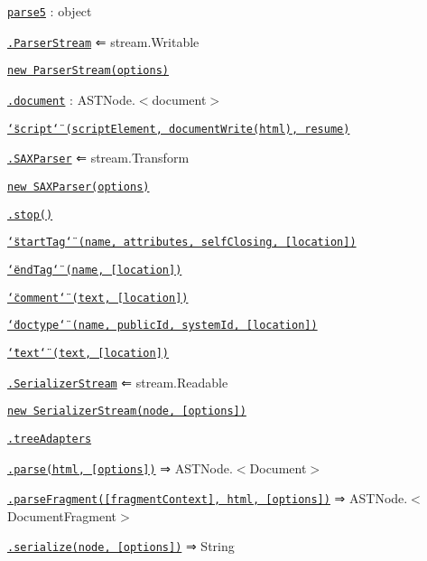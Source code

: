 \begin{DoxyItemize}
\item \href{#parse5}{\tt parse5} \+: {\ttfamily object}
\begin{DoxyItemize}
\item \href{#parse5+ParserStream}{\tt .Parser\+Stream} ⇐ {\ttfamily stream.\+Writable}
\begin{DoxyItemize}
\item \href{#new_parse5+ParserStream_new}{\tt new Parser\+Stream(options)}
\item \href{#parse5+ParserStream+document}{\tt .document} \+: {\ttfamily A\+S\+T\+Node.$<$document$>$}
\item \href{#parse5+ParserStream+event_script}{\tt \char`\"{}script\char`\"{} (script\+Element, document\+Write(html), resume)}
\end{DoxyItemize}
\item \href{#parse5+SAXParser}{\tt .S\+A\+X\+Parser} ⇐ {\ttfamily stream.\+Transform}
\begin{DoxyItemize}
\item \href{#new_parse5+SAXParser_new}{\tt new S\+A\+X\+Parser(options)}
\item \href{#parse5+SAXParser+stop}{\tt .stop()}
\item \href{#parse5+SAXParser+event_startTag}{\tt \char`\"{}start\+Tag\char`\"{} (name, attributes, self\+Closing, \mbox{[}location\mbox{]})}
\item \href{#parse5+SAXParser+event_endTag}{\tt \char`\"{}end\+Tag\char`\"{} (name, \mbox{[}location\mbox{]})}
\item \href{#parse5+SAXParser+event_comment}{\tt \char`\"{}comment\char`\"{} (text, \mbox{[}location\mbox{]})}
\item \href{#parse5+SAXParser+event_doctype}{\tt \char`\"{}doctype\char`\"{} (name, public\+Id, system\+Id, \mbox{[}location\mbox{]})}
\item \href{#parse5+SAXParser+event_text}{\tt \char`\"{}text\char`\"{} (text, \mbox{[}location\mbox{]})}
\end{DoxyItemize}
\item \href{#parse5+SerializerStream}{\tt .Serializer\+Stream} ⇐ {\ttfamily stream.\+Readable}
\begin{DoxyItemize}
\item \href{#new_parse5+SerializerStream_new}{\tt new Serializer\+Stream(node, \mbox{[}options\mbox{]})}
\end{DoxyItemize}
\item \href{#parse5+treeAdapters}{\tt .tree\+Adapters}
\item \href{#parse5+parse}{\tt .parse(html, \mbox{[}options\mbox{]})} ⇒ {\ttfamily A\+S\+T\+Node.$<$Document$>$}
\item \href{#parse5+parseFragment}{\tt .parse\+Fragment(\mbox{[}fragment\+Context\mbox{]}, html, \mbox{[}options\mbox{]})} ⇒ {\ttfamily A\+S\+T\+Node.$<$Document\+Fragment$>$}
\item \href{#parse5+serialize}{\tt .serialize(node, \mbox{[}options\mbox{]})} ⇒ {\ttfamily String}
\end{DoxyItemize}
\end{DoxyItemize}

